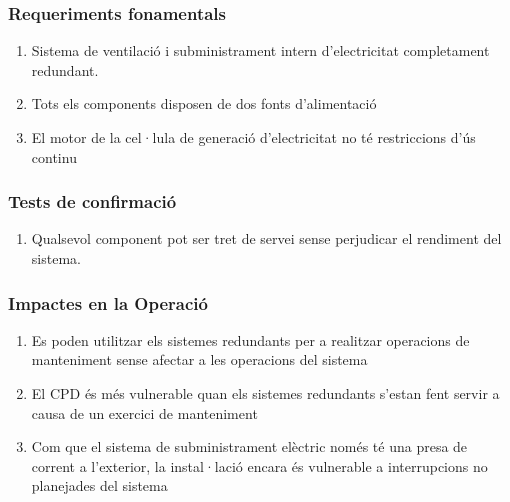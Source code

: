 \documentclass[11pt,a4paper,titlepage]{article}
\begin{document}
    \subsubsection{Requeriments fonamentals}
    \begin{enumerate}[nolistsep, label=\alph*.]
    \item Sistema de ventilació i subministrament intern d'electricitat completament redundant.
    \item Tots els components disposen de dos fonts d'alimentació
    \item El motor de la cel·lula de generació d'electricitat no té restriccions d'ús continu
    \end{enumerate}
    
    \subsubsection{Tests de confirmació}
    \begin{enumerate}[nolistsep, label=\alph*.]
    \item Qualsevol component pot ser tret de servei sense perjudicar el rendiment del sistema.
    \end{enumerate}
    
    \subsubsection{Impactes en la Operació}
    \begin{enumerate}[nolistsep, label=\alph*.]
    \item Es poden utilitzar els sistemes redundants per a realitzar operacions de manteniment sense afectar a les operacions del sistema
    \item El CPD és més vulnerable quan els sistemes redundants s'estan fent servir a causa de un exercici de manteniment
    \item Com que el sistema de subministrament elèctric només té una presa de corrent a l'exterior, la instal·lació encara és vulnerable a interrupcions no planejades del sistema
    \end{enumerate}
    
\end{document}
